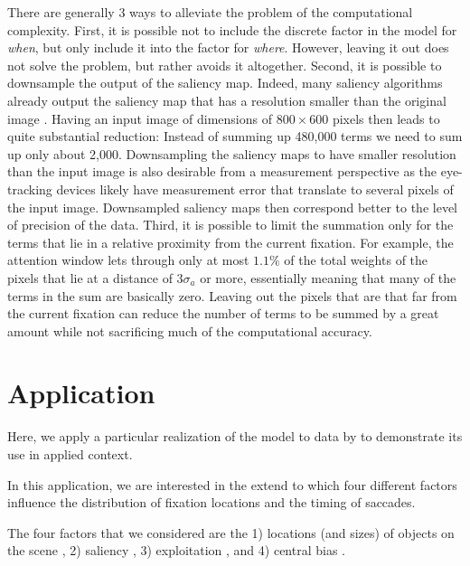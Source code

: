 \documentclass{article}
\begin{document}
There are generally 3 ways to alleviate the problem of the computational complexity. First, it is possible not to include the discrete factor in the model for \textit{when}, but only include it into the factor for \textit{where}. However, leaving it out does not solve the problem, but rather avoids it altogether. Second, it is possible to downsample the output of the saliency map. Indeed, many saliency algorithms already output the saliency map that has a resolution smaller than the original image \citep[e.g., by a factor of $16$ in each of the dimensions,][] {itti1998model}. Having an input image of dimensions of $800\times600$ pixels then leads to quite substantial reduction: Instead of summing up 480,000 terms we need to sum up only about 2,000. Downsampling the saliency maps to have smaller resolution than the input image is also desirable from a measurement perspective as the eye-tracking devices likely have measurement error that translate to several pixels of the input image.  Downsampled saliency maps then correspond better to the level of precision of the data. Third, it is possible to limit the summation only for the terms that lie in a relative proximity from the current fixation. For example, the attention window lets through only at most $1.1\%$ of the total weights of the pixels that lie at a distance of $3\sigma_a$ or more, essentially meaning that many of the terms in the sum are basically zero. Leaving out the pixels that are that far from the current fixation can reduce the number of terms to be summed by a great amount while not sacrificing much of the computational accuracy.



\section{Application}

Here, we apply a particular realization of the model to data by \citet{renswoude2019object_familiarity} to demonstrate its use in applied context.

In this application, we are interested in the extend to which four different factors influence the distribution of fixation locations and the timing of saccades. 

The four factors that we considered are the 1) locations (and sizes) of objects on the scene \citep{xu2014beyond,renswoude2019object_familiarity}, 2) saliency \citep{itti1998model,itti2000saliency,itti2001computational}, 3) exploitation \citep[i.e., tendency to make repeated fixations in a relative proximity to previous fixation;][]{malem2020exploration}, and 4) central bias \citep{renswoude2019central}. 
\end{document}
